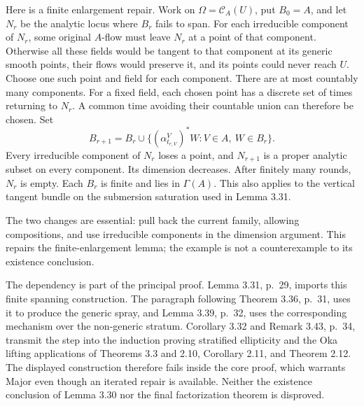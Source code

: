 \documentclass[10pt]{article}
\begin{document}
Here is a finite enlargement repair. Work on \(\Omega=\mathcal C_A(U)\), put \(B_0=A\), and let \(N_r\) be the analytic locus where \(B_r\) fails to span. For each irreducible component of \(N_r\), some original \(A\)-flow must leave \(N_r\) at a point of that component. Otherwise all these fields would be tangent to that component at its generic smooth points, their flows would preserve it, and its points could never reach \(U\). Choose one such point and field for each component. There are at most countably many components. For a fixed field, each chosen point has a discrete set of times returning to \(N_r\). A common time avoiding their countable union can therefore be chosen. Set \[B_{r+1}=B_r\cup
 \{(\alpha^V_{t_{r,V}})^*W:V\in A,\ W\in B_r\}.            \tag{3}\] Every irreducible component of \(N_r\) loses a point, and \(N_{r+1}\) is a proper analytic subset on every component. Its dimension decreases. After finitely many rounds, \(N_r\) is empty. Each \(B_r\) is finite and lies in \(\Gamma(A)\). This also applies to the vertical tangent bundle on the submersion saturation used in Lemma 3.31.\par
The two changes are essential: pull back the current family, allowing compositions, and use irreducible components in the dimension argument. This repairs the finite-enlargement lemma; the example is not a counterexample to its existence conclusion.\par
The dependency is part of the principal proof. Lemma 3.31, p. 29, imports this finite spanning construction. The paragraph following Theorem 3.36, p. 31, uses it to produce the generic spray, and Lemma 3.39, p. 32, uses the corresponding mechanism over the non-generic stratum. Corollary 3.32 and Remark 3.43, p. 34, transmit the step into the induction proving stratified ellipticity and the Oka lifting applications of Theorems 3.3 and 2.10, Corollary 2.11, and Theorem 2.12. The displayed construction therefore fails inside the core proof, which warrants Major even though an iterated repair is available. Neither the existence conclusion of Lemma 3.30 nor the final factorization theorem is disproved.\par
\end{document}
